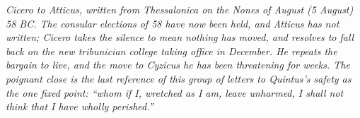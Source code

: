 
\textit{Cicero to Atticus, written from Thessalonica on the
Nones of August (5 August) 58 BC. The consular elections of
58 have now been held, and Atticus has not written; Cicero
takes the silence to mean nothing has moved, and resolves to
fall back on the new tribunician college taking office in
December. He repeats the bargain to live, and the move to
Cyzicus he has been threatening for weeks. The poignant close
 is the last reference of this group of letters
to Quintus's safety as the one fixed point: ``whom if I,
wretched as I am, leave unharmed, I shall not think that I
have wholly perished.''}
